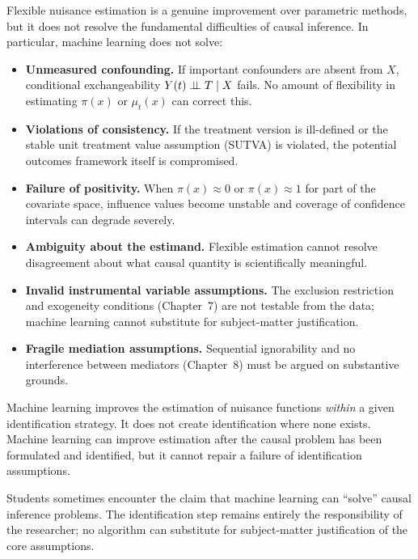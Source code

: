 \documentclass[master.tex]{subfiles}
\begin{document}
Flexible nuisance estimation is a genuine improvement over
parametric methods, but it does not resolve the fundamental
difficulties of causal inference.  In particular, machine learning
does not solve:
\begin{itemize}
  \item \textbf{Unmeasured confounding.}  If important confounders
    are absent from $X$, conditional exchangeability
    $Y(t) \perp\!\!\!\perp T \mid X$ fails.  No amount of flexibility in
    estimating $\pi(x)$ or $\mu_t(x)$ can correct this.
  \item \textbf{Violations of consistency.}  If the treatment version
    is ill-defined or the stable unit treatment value assumption
    (SUTVA) is violated, the potential outcomes framework itself
    is compromised.
  \item \textbf{Failure of positivity.}  When $\pi(x) \approx 0$
    or $\pi(x) \approx 1$ for part of the covariate space,
    influence values become unstable and coverage of confidence
    intervals can degrade severely.
  \item \textbf{Ambiguity about the estimand.}  Flexible estimation
    cannot resolve disagreement about what causal quantity is
    scientifically meaningful.
  \item \textbf{Invalid instrumental variable assumptions.}
    The exclusion restriction and exogeneity conditions
    (Chapter~7) are not testable from the data; machine learning
    cannot substitute for subject-matter justification.
  \item \textbf{Fragile mediation assumptions.}
    Sequential ignorability and no interference between
    mediators (Chapter~8) must be argued on substantive grounds.
\end{itemize}

Machine learning improves the estimation of nuisance functions
\emph{within} a given identification strategy.  It does not create
identification where none exists.  Machine learning can improve
estimation after the causal problem has been formulated and
identified, but it cannot repair a failure of identification
assumptions.

\begin{remark}
\label{w11:rem:ml-limits}
Students sometimes encounter the claim that machine learning can
``solve'' causal inference problems.  The identification step
remains entirely the responsibility of the researcher; no
algorithm can substitute for subject-matter justification of the
core assumptions.
\end{remark}
\end{document}
